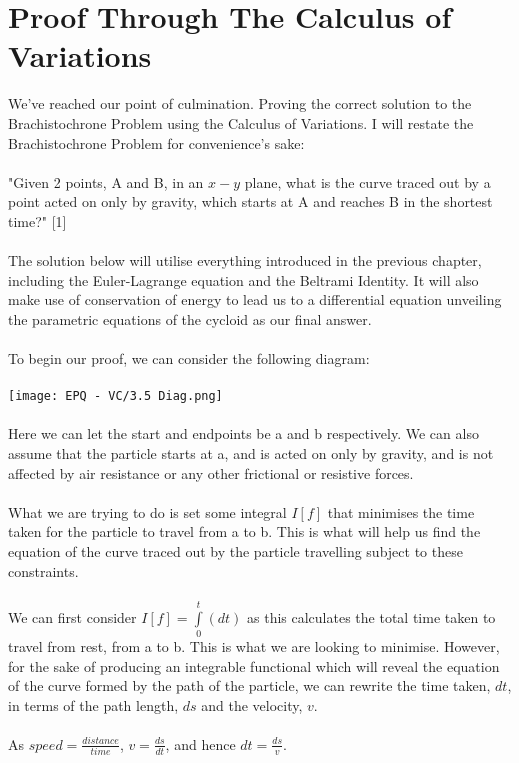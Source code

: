\documentclass[12pt]{report}
\begin{document}
\section{Proof Through The Calculus of Variations}
We've reached our point of culmination. Proving the correct solution to the Brachistochrone Problem using the Calculus of Variations. I will restate the Brachistochrone Problem for convenience's sake:
\\
\\
"Given 2 points, A and B, in an \(x-y\) plane, what is the curve traced out by a point acted on only by gravity, which starts at A and reaches B in the shortest time?" [1]
\\
\\
The solution below will utilise everything introduced in the previous chapter, including the Euler-Lagrange equation and the Beltrami Identity. It will also make use of conservation of energy to lead us to a differential equation unveiling the parametric equations of the cycloid as our final answer.
\\
\\
To begin our proof, we can consider the following diagram:
\\
\\
\texttt{[image: EPQ - VC/3.5 Diag.png]}
\\
\\
Here we can let the start and endpoints be a and b respectively. We can also assume that the particle starts at a, and is acted on only by gravity, and is not affected by air resistance or any other frictional or resistive forces.
\\
\\
What we are trying to do is set some integral \(I[f]\) that minimises the time taken for the particle to travel from a to b. This is what will help us find the equation of the curve traced out by the particle travelling subject to these constraints.
\\
\\
We can first consider \(I[f] = \int\limits_0^t (dt)\) as this calculates the total time taken to travel from rest, from a to b. This is what we are looking to minimise. However, for the sake of producing an integrable functional which will reveal the equation of the curve formed by the path of the particle, we can rewrite the time taken, \(dt\), in terms of the path length, \(ds\) and the velocity, \(v\).
\\
\\
As \(speed = \frac{distance}{time}\), \(v = \frac{ds}{dt}\), and hence \(dt = \frac{ds}{v}\).
\end{document}

